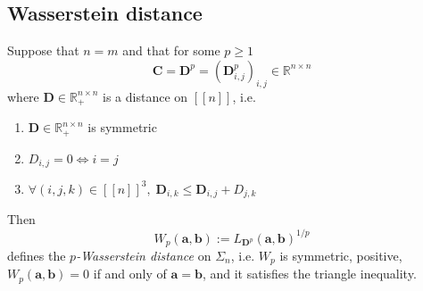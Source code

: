 \subsection{Wasserstein distance}

\begin{proposition}
Suppose that $n=m$ and that for some $p \geq 1$
$$\mathbf{C} = \mathbf{D}^{p} = (\mathbf{D}^{p}_{i, j})_{i,j} \in \mathbb{R}^{n \times n}$$
where $\mathbf{D} \in \mathbb{R}^{n \times n}_{+}$ is a distance on $[[ n ]]$, i.e.
\begin{enumerate}
  \item $\mathbf{D} \in \mathbb{R}^{n \times n}_{+}$ is symmetric
  \item $D_{i, j} = 0 \iff i = j$
  \item $\forall (i, j, k) \in [[n]]^{3}, \; \mathbf{D}_{i,k} \leq \mathbf{D}_{i,j} + D_{j,k}$
\end{enumerate}
Then
$$
W_{p}(\mathbf{a}, \mathbf{b}) := L_{\mathbf{D}^{p}} (\mathbf{a}, \mathbf{b}) ^{1/p}
$$
defines the \textit{$p$-Wasserstein distance} on $\Sigma_{n}$,
i.e. $W_{p}$ is symmetric, positive, $W_{p}(\mathbf{a}, \mathbf{b}) = 0$
if and only of $\mathbf{a} = \mathbf{b}$, and it satisfies the triangle inequality.
\end{proposition}
